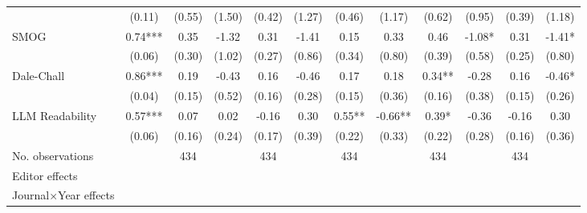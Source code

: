 \begin{table}
\begin{threeparttable}
\begin{tabular}{p{3cm}S@{}S@{}S@{}S@{}S@{}S@{}S@{}S@{}S@{}S@{}S@{}}
                                          &      (0.11)   &      (0.55)   &      (1.50)   &      (0.42)   &      (1.27)   &      (0.46)   &      (1.17)   &      (0.62)   &      (0.95)   &      (0.39)   &      (1.18)   \\
            SMOG                          &        0.74***&        0.35   &       -1.32   &        0.31   &       -1.41   &        0.15   &        0.33   &        0.46   &       -1.08*  &        0.31   &       -1.41*  \\
                                          &      (0.06)   &      (0.30)   &      (1.02)   &      (0.27)   &      (0.86)   &      (0.34)   &      (0.80)   &      (0.39)   &      (0.58)   &      (0.25)   &      (0.80)   \\
            Dale-Chall                    &        0.86***&        0.19   &       -0.43   &        0.16   &       -0.46   &        0.17   &        0.18   &        0.34** &       -0.28   &        0.16   &       -0.46*  \\
                                          &      (0.04)   &      (0.15)   &      (0.52)   &      (0.16)   &      (0.28)   &      (0.15)   &      (0.36)   &      (0.16)   &      (0.38)   &      (0.15)   &      (0.26)   \\
            LLM Readability               &        0.57***&        0.07   &        0.02   &       -0.16   &        0.30   &        0.55** &       -0.66** &        0.39*  &       -0.36   &       -0.16   &        0.30   \\
                                          &      (0.06)   &      (0.16)   &      (0.24)   &      (0.17)   &      (0.39)   &      (0.22)   &      (0.33)   &      (0.22)   &      (0.28)   &      (0.16)   &      (0.36)   \\
            \midrule
            No. observations              &               &         434   &               &         434   &               &         434   &               &         434   &               &         434   &               \\
            \midrule
            Editor effects       &               &           {}   &               &           {}   &               &           {}   &               &           {}   &               &               &               \\
            Journal\(\times\)Year effects          &               &           {}   &               &           {}   &               &           {}   &               &           {}   &               &               &               \\

\end{tabular}
\end{threeparttable}
\end{table}
